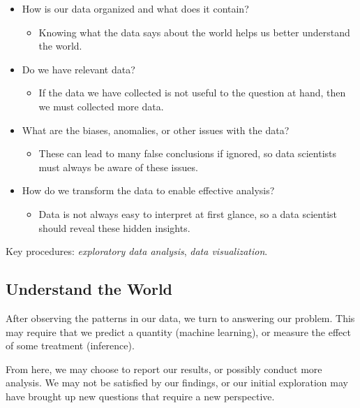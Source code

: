 \documentclass[
  letterpaper,
  DIV=11,
  numbers=noendperiod]{scrreprt}
\providecommand{\tightlist}{%
  \setlength{\itemsep}{0pt}\setlength{\parskip}{0pt}}\usepackage{longtable,booktabs,array}
\begin{document}
\begin{itemize}
\tightlist
\item
  How is our data organized and what does it contain?

  \begin{itemize}
  \tightlist
  \item
    Knowing what the data says about the world helps us better
    understand the world.
  \end{itemize}
\item
  Do we have relevant data?

  \begin{itemize}
  \tightlist
  \item
    If the data we have collected is not useful to the question at hand,
    then we must collected more data.
  \end{itemize}
\item
  What are the biases, anomalies, or other issues with the data?

  \begin{itemize}
  \tightlist
  \item
    These can lead to many false conclusions if ignored, so data
    scientists must always be aware of these issues.
  \end{itemize}
\item
  How do we transform the data to enable effective analysis?

  \begin{itemize}
  \tightlist
  \item
    Data is not always easy to interpret at first glance, so a data
    scientist should reveal these hidden insights.
  \end{itemize}
\end{itemize}

Key procedures: \emph{exploratory data analysis}, \emph{data
visualization}.

\hypertarget{understand-the-world}{%
\subsection{Understand the World}\label{understand-the-world}}

After observing the patterns in our data, we turn to answering our
problem. This may require that we predict a quantity (machine learning),
or measure the effect of some treatment (inference).

From here, we may choose to report our results, or possibly conduct more
analysis. We may not be satisfied by our findings, or our initial
exploration may have brought up new questions that require a new
perspective.
\end{document}
